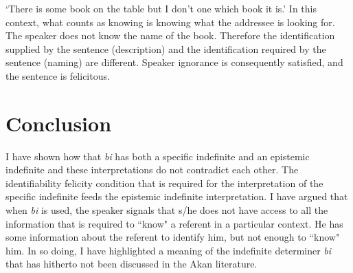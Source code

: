 \documentclass[output=paper,
modfonts
]{langsci/langscibook}
\begin{document}
\glt `There is some book on the table but I don't one which book it is.'
\z In this context, what counts as knowing is knowing what the addressee is looking for. The speaker does not know the name of the book. Therefore the identification supplied by the sentence (description) and the identification required by the sentence (naming) are different. Speaker ignorance is consequently satisfied, and the sentence is felicitous. 

\section{Conclusion}

I have shown how that \emph{bi} has both a  specific indefinite and an epistemic indefinite and these interpretations do not contradict each other. The identifiability felicity condition that is required for the interpretation of the specific indefinite feeds the epistemic indefinite interpretation. I have argued that when \emph{bi} is used, the speaker signals that s/he does not have access to all the information that is required to ``know" a referent in a particular context. He has some information about the referent to identify him, but not enough to ``know" him. In so doing, I have highlighted a meaning of the indefinite determiner \emph{bi} that has hitherto not been discussed in the Akan literature. 
 


\end{document}
